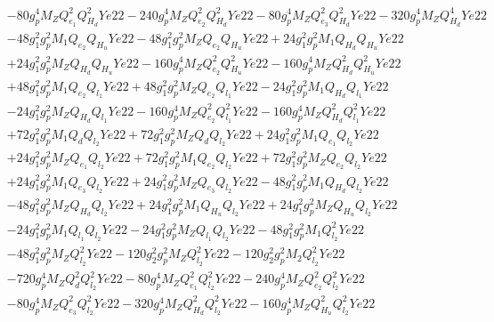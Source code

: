 \begin{align}
 &-80 g_{p}^{4} M_Z Q_{e_{1}}^{2} Q_{H_d}^{2} Ye22 -240 g_{p}^{4} M_Z Q_{e_{2}}^{2} Q_{H_d}^{2} Ye22 -80 g_{p}^{4} M_Z Q_{e_3}^{2} Q_{H_d}^{2} Ye22 -320 g_{p}^{4} M_Z Q_{H_d}^{4} Ye22 \nonumber \\ 
 &-48 g_{1}^{2} g_{p}^{2} M_1 Q_{e_{2}} Q_{H_u} Ye22 -48 g_{1}^{2} g_{p}^{2} M_Z Q_{e_{2}} Q_{H_u} Ye22 +24 g_{1}^{2} g_{p}^{2} M_1 Q_{H_d} Q_{H_u} Ye22 \nonumber \\ 
 &+24 g_{1}^{2} g_{p}^{2} M_Z Q_{H_d} Q_{H_u} Ye22 -160 g_{p}^{4} M_Z Q_{e_{2}}^{2} Q_{H_u}^{2} Ye22 -160 g_{p}^{4} M_Z Q_{H_d}^{2} Q_{H_u}^{2} Ye22 \nonumber \\ 
 &+48 g_{1}^{2} g_{p}^{2} M_1 Q_{e_{2}} Q_{l_1} Ye22 +48 g_{1}^{2} g_{p}^{2} M_Z Q_{e_{2}} Q_{l_1} Ye22 -24 g_{1}^{2} g_{p}^{2} M_1 Q_{H_d} Q_{l_1} Ye22 \nonumber \\ 
 &-24 g_{1}^{2} g_{p}^{2} M_Z Q_{H_d} Q_{l_1} Ye22 -160 g_{p}^{4} M_Z Q_{e_{2}}^{2} Q_{l_1}^{2} Ye22 -160 g_{p}^{4} M_Z Q_{H_d}^{2} Q_{l_1}^{2} Ye22 \nonumber \\ 
 &+72 g_{1}^{2} g_{p}^{2} M_1 Q_{d} Q_{l_2} Ye22 +72 g_{1}^{2} g_{p}^{2} M_Z Q_{d} Q_{l_2} Ye22 +24 g_{1}^{2} g_{p}^{2} M_1 Q_{e_{1}} Q_{l_2} Ye22 \nonumber \\ 
 &+24 g_{1}^{2} g_{p}^{2} M_Z Q_{e_{1}} Q_{l_2} Ye22 +72 g_{1}^{2} g_{p}^{2} M_1 Q_{e_{2}} Q_{l_2} Ye22 +72 g_{1}^{2} g_{p}^{2} M_Z Q_{e_{2}} Q_{l_2} Ye22 \nonumber \\ 
 &+24 g_{1}^{2} g_{p}^{2} M_1 Q_{e_3} Q_{l_2} Ye22 +24 g_{1}^{2} g_{p}^{2} M_Z Q_{e_3} Q_{l_2} Ye22 -48 g_{1}^{2} g_{p}^{2} M_1 Q_{H_d} Q_{l_2} Ye22 \nonumber \\ 
 &-48 g_{1}^{2} g_{p}^{2} M_Z Q_{H_d} Q_{l_2} Ye22 +24 g_{1}^{2} g_{p}^{2} M_1 Q_{H_u} Q_{l_2} Ye22 +24 g_{1}^{2} g_{p}^{2} M_Z Q_{H_u} Q_{l_2} Ye22 \nonumber \\ 
 &-24 g_{1}^{2} g_{p}^{2} M_1 Q_{l_1} Q_{l_2} Ye22 -24 g_{1}^{2} g_{p}^{2} M_Z Q_{l_1} Q_{l_2} Ye22 -48 g_{1}^{2} g_{p}^{2} M_1 Q_{l_2}^{2} Ye22 \nonumber \\ 
 &-48 g_{1}^{2} g_{p}^{2} M_Z Q_{l_2}^{2} Ye22 -120 g_{2}^{2} g_{p}^{2} M_Z Q_{l_2}^{2} Ye22 -120 g_{2}^{2} g_{p}^{2} M_2 Q_{l_2}^{2} Ye22 \nonumber \\ 
 &-720 g_{p}^{4} M_Z Q_{d}^{2} Q_{l_2}^{2} Ye22 -80 g_{p}^{4} M_Z Q_{e_{1}}^{2} Q_{l_2}^{2} Ye22 -240 g_{p}^{4} M_Z Q_{e_{2}}^{2} Q_{l_2}^{2} Ye22 \nonumber \\ 
 &-80 g_{p}^{4} M_Z Q_{e_3}^{2} Q_{l_2}^{2} Ye22 -320 g_{p}^{4} M_Z Q_{H_d}^{2} Q_{l_2}^{2} Ye22 -160 g_{p}^{4} M_Z Q_{H_u}^{2} Q_{l_2}^{2} Ye22 \nonumber \\ 

\end{align}
